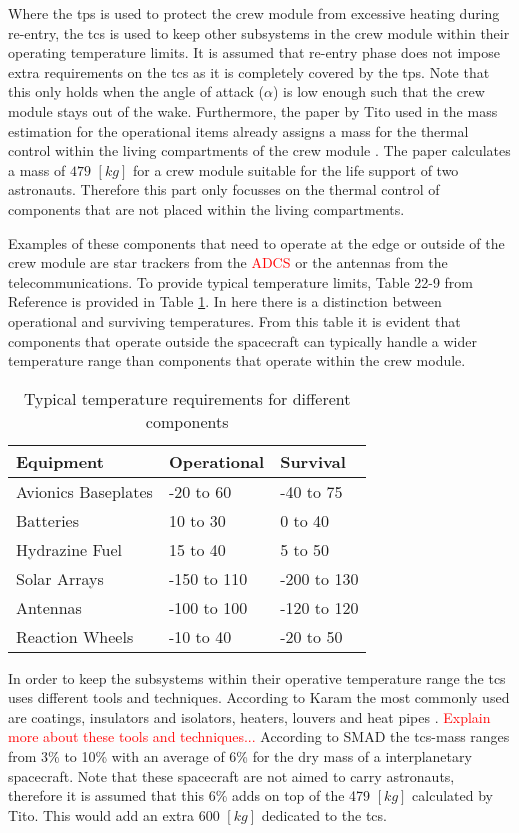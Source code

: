 Where the \acrfull{tps} is used to protect the crew module from excessive heating during re-entry, the \acrfull{tcs} is used to keep other subsystems in the crew module within their operating temperature limits. It is assumed that re-entry phase does not impose extra requirements on the \gls{tcs} as it is completely covered by the \gls{tps}. Note that this only holds when the angle of attack ($\alpha$) is low enough such that the crew module stays out of the wake. Furthermore, the paper by Tito used in the mass estimation for the operational items already assigns a mass for the thermal control within the living compartments of the crew module \cite{Tito2013}. The paper calculates a mass of $479$ $[kg]$ for a crew module suitable for the life support of two astronauts. Therefore this part only focusses on the thermal control of components that are not placed within the living compartments.

Examples of these components that need to operate at the edge or outside of the crew module are star trackers from the \textcolor{red}{ADCS} or the antennas from the telecommunications. To provide typical temperature limits, Table 22-9 from Reference \cite{Wertz2011} is provided in Table \ref{tab:cmtherm}. In here there is a distinction between operational and surviving temperatures. From this table it is evident that components that operate outside the spacecraft can typically handle a wider temperature range than components that operate within the crew module.

\begin{table}[h]
	\centering
	\caption{Typical temperature requirements for different components}
	\begin{tabular}{|l|ll|}
		\hline
		\textbf{Equipment} & \textbf{Operational} & \textbf{Survival}\\ \hline \hline
		Avionics Baseplates & -20 to 60 & -40 to 75 \\
		Batteries & 10 to 30 & 0 to 40 \\
		Hydrazine Fuel & 15 to 40 & 5 to 50 \\
		Solar Arrays & -150 to 110 & -200 to 130 \\
		Antennas & -100 to 100 & -120 to 120 \\
		Reaction Wheels & -10 to 40 & -20 to 50 \\
		\hline
	\end{tabular}
	\label{tab:cmtherm}
\end{table}

In order to keep the subsystems within their operative temperature range the \gls{tcs} uses different tools and techniques. According to Karam the most commonly used are coatings, insulators and isolators, heaters, louvers and heat pipes \cite{Karam1998}. \textcolor{red}{Explain more about these tools and techniques...}
According to SMAD the \gls{tcs}-mass ranges from 3\% to 10\% with an average of 6\% for the dry mass of a interplanetary spacecraft. Note that these spacecraft are not aimed to carry astronauts, therefore it is assumed that this 6\% adds on top of the 479 $[kg]$ calculated by Tito. This would add an extra 600 $[kg]$ dedicated to the \gls{tcs}.

